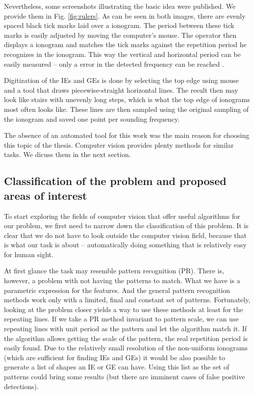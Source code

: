 Nevertheless, some screenshots illustrating the basic idea were published. We provide them in Fig. \ref{fig:rulers}. As can be seen in both images, there are evenly spaced black tick marks laid over a ionogram. The period between these tick marks is easily adjusted by moving the computer's mouse. The operator then displays a ionogram and matches the tick marks against the repetition period he recognizes in the ionogram. This way the vertical and horizontal period can be easily measured -- only a  error in the detected frequency can be reached \citep[p.~2]{Duru2008}.

Digitization of the IEs and GEs is done by selecting the top edge using mouse and a tool that draws piecewise-straight horizontal lines. The result then may look like stairs with unevenly long steps, which is what the top edge of ionograms most often looks like. These lines are then sampled using the original sampling of the ionogram and saved one point per sounding frequency.

The absence of an automated tool for this work was the main reason for choosing this topic of the thesis. Computer vision provides plenty methods for similar tasks. We dicuss them in the next section.

\subsection{Classification of the problem and proposed areas of interest}
To start exploring the fields of computer vision that offer useful algorithms for our problem, we first need to narrow down the classification of this problem. It is clear that we do not have to look outside the computer vision field, because that is what our task is about -- automatically doing something that is relatively easy for human sight. 

At first glance the task may resemble pattern recognition (PR). There is, however, a problem with not having the patterns to match. What we have is a parametric expression for the features. And the general pattern recognition methods work only with a limited, final and constant set of patterns. Fortunately, looking at the problem closer yields a way to use these methods at least for the repeating lines. If we take a PR method invariant to pattern scale, we can use repeating lines with unit period as the pattern and let the algorithm match it. If the algorithm allows getting the scale of the pattern, the real repetition period is easily found. Due to the relatively small resolution of the non-uniform ionograms (which are sufficient for finding IEs and GEs) it would be also possible to generate a list of shapes an IE or GE can have. Using this list as the set of patterns could bring some results (but there are imminent cases of false positive detections). 

